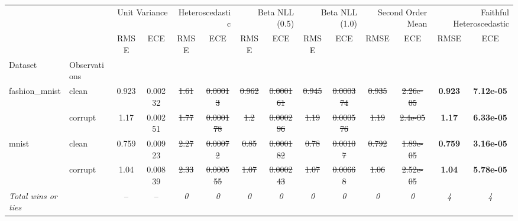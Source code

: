 \begin{tabular}{ll|cc|cc|cc|cc|cc|cc}
\toprule
{} & {} & \multicolumn{2}{r}{Unit Variance} & \multicolumn{2}{r}{Heteroscedastic} & \multicolumn{2}{r}{Beta NLL (0.5)} & \multicolumn{2}{r}{Beta NLL (1.0)} & \multicolumn{2}{r}{Second Order Mean} & \multicolumn{2}{r}{Faithful Heteroscedastic} \\
{} & {} & {RMSE} & {ECE} & {RMSE} & {ECE} & {RMSE} & {ECE} & {RMSE} & {ECE} & {RMSE} & {ECE} & {RMSE} & {ECE} \\
{Dataset} & {Observations} & {} & {} & {} & {} & {} & {} & {} & {} & {} & {} & {} & {} \\
\midrule
\multirow[t]{2}{*}{fashion_mnist} & clean & 0.923 & 0.00232 & \sout{1.61} & \sout{0.00013} & \sout{0.962} & \sout{0.000161} & \sout{0.945} & \sout{0.000374} & \sout{0.935} & \sout{2.26e-05} & \textbf{0.923} & \textbf{7.12e-05} \\
 & corrupt & 1.17 & 0.00251 & \sout{1.77} & \sout{0.000178} & \sout{1.2} & \sout{0.000296} & \sout{1.19} & \sout{0.000576} & \sout{1.19} & \sout{2.4e-05} & \textbf{1.17} & \textbf{6.33e-05} \\
\multirow[t]{2}{*}{mnist} & clean & 0.759 & 0.00923 & \sout{2.27} & \sout{0.00072} & \sout{0.85} & \sout{0.000182} & \sout{0.78} & \sout{0.00107} & \sout{0.792} & \sout{1.89e-05} & \textbf{0.759} & \textbf{3.16e-05} \\
 & corrupt & 1.04 & 0.00839 & \sout{2.33} & \sout{0.000555} & \sout{1.07} & \sout{0.000243} & \sout{1.07} & \sout{0.00668} & \sout{1.06} & \sout{2.52e-05} & \textbf{1.04} & \textbf{5.78e-05} \\
\textit{{Total wins or ties}} &  & -- & -- & \textit{0} & \textit{0} & \textit{0} & \textit{0} & \textit{0} & \textit{0} & \textit{0} & \textit{0} & \textit{4} & \textit{4} \\
\bottomrule
\end{tabular}
